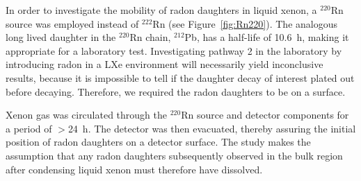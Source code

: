 
In order to investigate the mobility of radon daughters in liquid xenon, a $^{220}$Rn source was employed instead of $^{222}$Rn (see Figure~\ref{fig:Rn220}). The analogous long lived daughter in the $^{220}$Rn chain, $^{212}$Pb, has a half-life of 10.6~h, making it appropriate for a laboratory test. Investigating pathway 2 in the laboratory by introducing radon in a \ac{LXe} environment will necessarily yield inconclusive results, because it is impossible to tell if the daughter decay of interest plated out before decaying. Therefore, we required the radon daughters to be on a surface.

Xenon gas was circulated through the $^{220}$Rn source and detector components for a period of $>$24~h. The detector was then evacuated, thereby assuring the initial position of radon daughters on a detector surface. The study makes the assumption that any radon daughters subsequently observed in the bulk region after condensing liquid xenon must therefore have dissolved.




